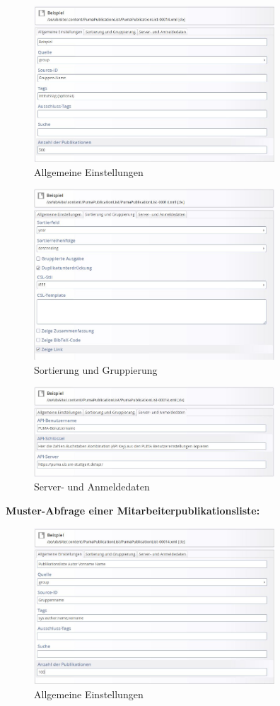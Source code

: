 \begin{figure}[h!]
 \centering
 \includegraphics[width=9cm]{Bilder/Kapitel9/Institutsliste1}
 \caption{Allgemeine Einstellungen}
 \label{fig:iplAllgemeineEinstellungen}
\end{figure}\begin{figure}[h!]
 \centering
 \includegraphics[width=9cm]{Bilder/Kapitel9/Institutsliste2}
 \caption{Sortierung und Gruppierung}
 \label{fig:iplSortierungGruppierung}
\end{figure}\begin{figure}[h!]
 \centering
 \includegraphics[width=9cm]{Bilder/Kapitel9/Institutsliste3}
 \caption{Server- und Anmeldedaten}
 \label{fig:iplServerAnmeldedaten}
\end{figure}
\textbf {Muster-Abfrage einer Mitarbeiterpublikationsliste:}
\begin{figure}[h!]
 \centering
 \includegraphics[width=9cm]{Bilder/Kapitel9/Mitarbeiterliste1}
 \caption{Allgemeine Einstellungen}
 \label{fig:mplAllgemeineEinstellungen}
\end{figure}
